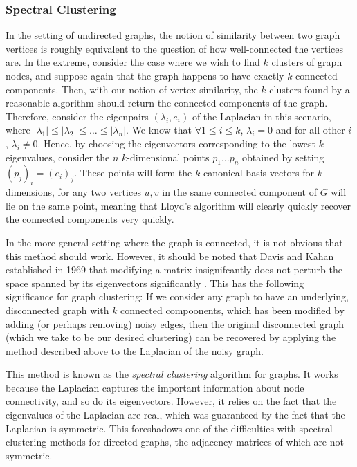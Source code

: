 \subsubsection{Spectral Clustering}
In the setting of undirected graphs, the notion of similarity between two graph vertices is roughly 
equivalent to the question of how well-connected the vertices are. In the extreme, consider the case
where we wish to find $k$ clusters of graph nodes, and suppose again that the graph happens to have 
exactly $k$ connected components. Then, with our notion of vertex similarity, the $k$ clusters 
found by a reasonable algorithm should return the connected components of the graph. Therefore, 
consider the eigenpairs $(\lambda_i, e_i)$ of the Laplacian in this scenario, where $|\lambda_1| 
\leq |\lambda_2| \leq \hdots \leq |\lambda_n|$. We know that $\forall 1\leq i \leq k$, $\lambda_i 
=0$ and for all other $i$, $\lambda_i \neq 0$. Hence, by choosing the eigenvectors corresponding
to the lowest $k$ eigenvalues, consider the $n$ $k$-dimensional points $p_1 \hdots p_n$ obtained by
setting $(p_j)_i = (e_i)_j$. These points will form the $k$ canonical basis vectors for $k$ 
dimensions, for any two vertices $u,v$ in the same connected component of $G$ will lie on the same 
point, meaning that Lloyd's algorithm will clearly quickly recover the connected components very 
quickly.

In the more general setting where the graph is connected, it is not obvious that this method should 
work. However, it should be noted that Davis and Kahan 
established in 1969 that modifying a matrix insignifcantly does not perturb the space spanned by 
its eigenvectors significantly \cite{daviskahan}. This has the following significance for graph clustering: If we 
consider any graph to have an underlying, disconnected graph with $k$ connected compoonents, which
has been modified by adding (or perhaps removing) noisy edges, then the original disconnected graph
(which we take to be our desired clustering) can be recovered by applying the method described 
above to the Laplacian of the noisy graph.

This method is known as the \emph{spectral clustering} algorithm for graphs. It works because the Laplacian captures the important 
information about node connectivity, and so do its eigenvectors. However, it relies on the fact that
the eigenvalues of the Laplacian are real, which was guaranteed by the fact that the Laplacian is 
symmetric. This foreshadows one of the difficulties with spectral clustering methods for directed 
graphs, the adjacency matrices of which are not symmetric.

